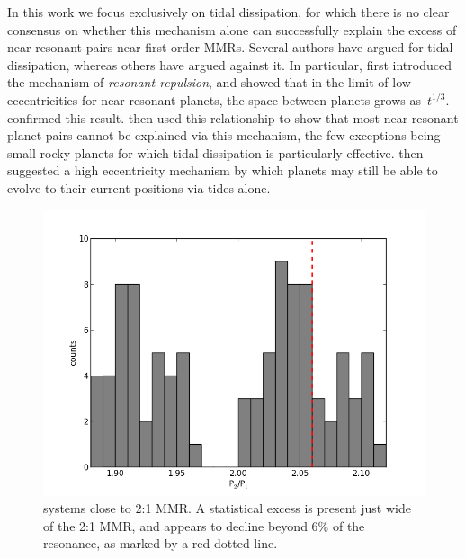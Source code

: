 In this work we focus exclusively on tidal dissipation, for which there is no clear consensus on whether this mechanism alone can successfully explain the excess of near-resonant pairs near first order MMRs. 
Several authors \citep{LithwickWu2012,Batygin2013} have argued for \citep{Delisle2014} tidal dissipation, whereas others \citep{Lee2013} have argued against it. 
In particular, \citet{LithwickWu2012} first introduced the mechanism of \textit{resonant repulsion}, and showed that in the limit of low eccentricities for near-resonant planets, the space between planets grows as~$t^{1/3}$.
\citet{Batygin2013} confirmed this result.
\citet{Lee2013} then used this relationship to show that most near-resonant planet pairs cannot be explained via this mechanism, the few exceptions being small rocky planets for which tidal dissipation is particularly effective.
\citet{Delisle2014} then suggested a high eccentricity mechanism by which planets may still be able to evolve to their current positions via tides alone.

\begin{figure}
\centerline{\includegraphics[scale=0.49]{chap3/MMR.png}}
\caption{ \kep{} systems close to 2:1 MMR. A statistical excess is present just wide of the 2:1 MMR, and appears to decline beyond $6\%$ of the resonance, as marked by a red dotted line. 
 }
\label{fig:MMR}
\end{figure}

